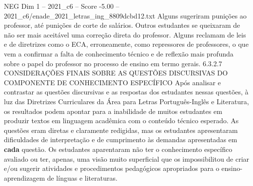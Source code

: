\begin{textsample}{NEG Dim 1 – 2021\_c6 – Score -5.00 – 2021\_c6/enade\_2021\_letras\_ing\_8809dcbd12.txt}
Alguns sugeriram punições ao professor, até punições de corte de salários.
Outros estudantes se queixaram de não ser mais aceitável uma correção direta do professor.
Alguns reclamam de leis e de diretrizes como o ECA, erroneamente, como repressores de professores, o que vem a confirmar a falta de conhecimento técnico e de reflexão mais profunda sobre o papel do professor no processo de ensino em termo gerais. 6.3.2.7 CONSIDERAÇÕES FINAIS SOBRE AS QUESTÕES DISCURSIVAS DO COMPONENTE DE CONHECIMENTO ESPECÍFICO Após analisar e contrastar as questões discursivas e as respostas dos estudantes nessas questões, à luz das Diretrizes Curriculares da Área para Letras Português-Inglês e Literatura, os resultados podem apontar para a inabilidade de muitos estudantes em produzir textos em linguagem acadêmica com o conteúdo técnico esperado.
As questões eram diretas e claramente redigidas, mas os estudantes apresentaram dificuldades de interpretação e de cumprimento às demandas apresentadas em \textbf{cada} questão.
Os estudantes aparentaram não ter o conhecimento específico avaliado ou ter, apenas, uma visão muito superficial que os impossibilitou de criar e/ou sugerir atividades e procedimentos pedagógicos apropriados para o ensino-aprendizagem de línguas e literaturas.

\end{textsample}
